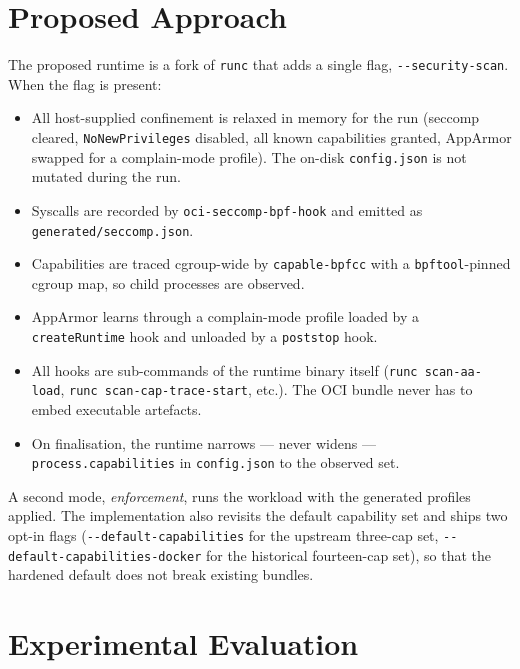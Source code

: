 \section{Proposed Approach}

The proposed runtime is a fork of \texttt{runc} that adds a single flag, \texttt{-{}-security-scan}. When the flag is present:

\begin{itemize}
    \item All host-supplied confinement is relaxed in memory for the run (seccomp cleared, \texttt{NoNewPrivileges} disabled, all known capabilities granted, AppArmor swapped for a complain-mode profile). The on-disk \texttt{config.json} is not mutated during the run.
    \item Syscalls are recorded by \texttt{oci-seccomp-bpf-hook} and emitted as \texttt{generated/seccomp.json}.
    \item Capabilities are traced cgroup-wide by \texttt{capable-bpfcc} with a \texttt{bpftool}-pinned cgroup map, so child processes are observed.
    \item AppArmor learns through a complain-mode profile loaded by a \texttt{createRuntime} hook and unloaded by a \texttt{poststop} hook.
    \item All hooks are sub-commands of the runtime binary itself (\texttt{runc scan-aa-load}, \texttt{runc scan-cap-trace-start}, etc.). The OCI bundle never has to embed executable artefacts.
    \item On finalisation, the runtime narrows --- never widens --- \texttt{process.capabilities} in \texttt{config.json} to the observed set.
\end{itemize}

A second mode, \emph{enforcement}, runs the workload with the generated profiles applied. The implementation also revisits the default capability set and ships two opt-in flags (\texttt{-{}-default-capabilities} for the upstream three-cap set, \texttt{-{}-default-capabilities-docker} for the historical fourteen-cap set), so that the hardened default does not break existing bundles.

\section{Experimental Evaluation}

